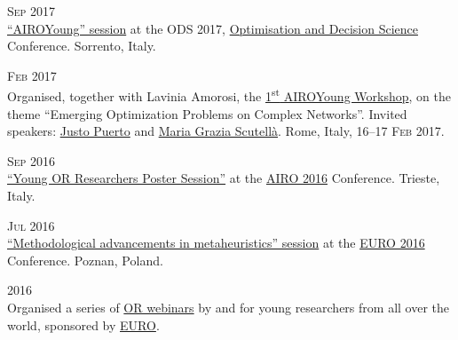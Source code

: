 \begin{paracol}{2}
  \textsc{Sep 2017}
\switchcolumn
  \\
  \href{https://santini.in/files/cv/ods17-prog.pdf}{``AIROYoung'' session} at the ODS 2017, \href{http://web.archive.org/web/20180219031743/http://www.airoconference.it/ods2017/}{Optimisation and Decision Science} Conference.
  Sorrento, Italy.
\end{paracol}

\begin{paracol}{2}
  \textsc{Feb 2017}
\switchcolumn
  \\
    Organised, together with Lavinia Amorosi, the \href{https://workshop.airoyoung.org/2017}{1\textsuperscript{st} AIROYoung Workshop}, on the theme ``Emerging Optimization Problems on Complex Networks''.
    Invited speakers: \href{https://scholar.google.com/citations?user=koF66usAAAAJ}{Justo Puerto} and \href{https://scholar.google.com/citations?user=PcGjfV8AAAAJ}{Maria Grazia Scutellà}.
    Rome, Italy, \textsc{16--17 Feb 2017}.
\end{paracol}

\begin{paracol}{2}
  \textsc{Sep 2016}
\switchcolumn
  \\
  \href{https://santini.in/files/cv/airo16-prog.pdf}{``Young OR Researchers Poster Session''} at the \href{http://web.archive.org/web/20161031094953/http://www.airo.org/conferences/airo2016/}{AIRO 2016} Conference.
  Trieste, Italy.
\end{paracol}

\begin{paracol}{2}
  \textsc{Jul 2016}
\switchcolumn
  \\
  \href{https://santini.in/files/cv/euro16-prog.pdf}{``Methodological advancements in metaheuristics'' session} at the \href{http://web.archive.org/web/20180923153214/https://euro2016.euro-online.org/}{EURO 2016} Conference.
  Poznan, Poland.
\end{paracol}

\begin{paracol}{2}
    \textsc{2016}
\switchcolumn
  \\
  Organised a series of \href{https://www.airoyoung.org/resources/euro-seminars}{OR webinars} by and for young researchers from all over the world, sponsored by \href{https://www.euro-online.org}{EURO}.
\end{paracol}

